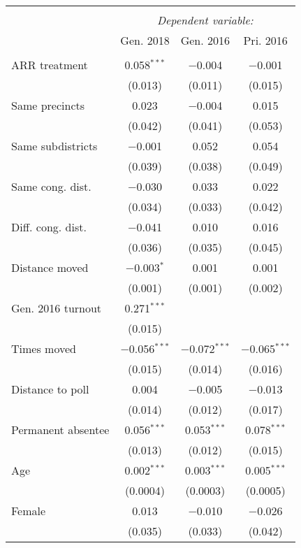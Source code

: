 
\begin{tabular}{@{\extracolsep{5pt}}lccc} 
\\[-1.8ex]\hline 
\hline \\[-1.8ex] 
 & \multicolumn{3}{c}{\textit{Dependent variable:}} \\ 
\cline{2-4} 
 & Gen. 2018 & Gen. 2016 & Pri. 2016 \\ 
\hline \\[-1.8ex] 
 ARR treatment & 0.058$^{***}$ & $-$0.004 & $-$0.001 \\ 
  & (0.013) & (0.011) & (0.015) \\ 
  Same precincts & 0.023 & $-$0.004 & 0.015 \\ 
  & (0.042) & (0.041) & (0.053) \\ 
  Same subdistricts & $-$0.001 & 0.052 & 0.054 \\ 
  & (0.039) & (0.038) & (0.049) \\ 
  Same cong. dist. & $-$0.030 & 0.033 & 0.022 \\ 
  & (0.034) & (0.033) & (0.042) \\ 
  Diff. cong. dist. & $-$0.041 & 0.010 & 0.016 \\ 
  & (0.036) & (0.035) & (0.045) \\ 
  Distance moved & $-$0.003$^{*}$ & 0.001 & 0.001 \\ 
  & (0.001) & (0.001) & (0.002) \\ 
  Gen. 2016 turnout & 0.271$^{***}$ &  &  \\ 
  & (0.015) &  &  \\ 
  Times moved & $-$0.056$^{***}$ & $-$0.072$^{***}$ & $-$0.065$^{***}$ \\ 
  & (0.015) & (0.014) & (0.016) \\ 
  Distance to poll & 0.004 & $-$0.005 & $-$0.013 \\ 
  & (0.014) & (0.012) & (0.017) \\ 
  Permanent absentee & 0.056$^{***}$ & 0.053$^{***}$ & 0.078$^{***}$ \\ 
  & (0.013) & (0.012) & (0.015) \\ 
  Age & 0.002$^{***}$ & 0.003$^{***}$ & 0.005$^{***}$ \\ 
  & (0.0004) & (0.0003) & (0.0005) \\ 
  Female & 0.013 & $-$0.010 & $-$0.026 \\ 
  & (0.035) & (0.033) & (0.042) \\ 

\end{tabular}
